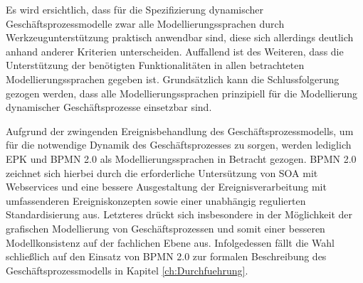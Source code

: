 Es wird ersichtlich, dass für die Spezifizierung dynamischer Geschäftsprozessmodelle zwar alle Modellierungssprachen durch Werkzeugunterstützung praktisch anwendbar sind, diese sich allerdings deutlich anhand anderer Kriterien unterscheiden. Auffallend ist des Weiteren, dass die Unterstützung der benötigten Funktionalitäten in allen betrachteten Modellierungssprachen gegeben ist.  Grundsätzlich kann die Schlussfolgerung gezogen werden, dass alle Modellierungssprachen prinzipiell für die Modellierung dynamischer Geschäftsprozesse einsetzbar sind. 

Aufgrund der zwingenden Ereignisbehandlung des Geschäftsprozessmodells, um für die notwendige Dynamik des Geschäftsprozesses zu sorgen, werden lediglich \ac{EPK} und \ac{BPMN} 2.0 als Modellierungssprachen in Betracht gezogen. 
\ac{BPMN} 2.0 zeichnet sich hierbei durch die erforderliche Untersützung von SOA mit Webservices und eine bessere Ausgestaltung der Ereignisverarbeitung mit umfassenderen Ereigniskonzepten sowie einer unabhängig regulierten Standardisierung aus. Letzteres drückt sich insbesondere in der Möglichkeit der grafischen Modellierung von Geschäftsprozessen und somit einer besseren Modellkonsistenz auf der fachlichen Ebene aus. Infolgedessen fällt die Wahl schließlich auf den Einsatz von \ac{BPMN} 2.0 zur formalen Beschreibung des Geschäftsprozessmodells in Kapitel \ref{ch:Durchfuehrung}. 
